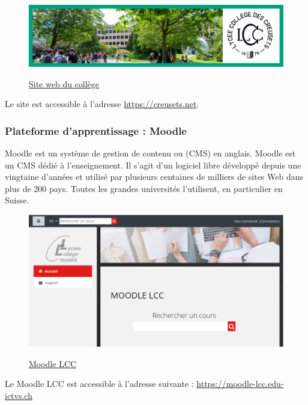 \documentclass[10pt,a4paper]{report}
\begin{document}
\begin{figure}[H]
	\centering
	\href{https://creusets.net}{
		\includegraphics[width=0.75\linewidth]{images/capture_creusets_20210811.png}
	}
	\caption{\protect \href{https://edu.vs.ch}{Site web du collège}}
	\label{fig:capturecreusets20210811}
\end{figure}

Le site est accessible à l'adresse \href{https://creusets.net}{https://creusets.net}.



\subsubsection{Plateforme d'apprentissage : Moodle}

Moodle est un système de gestion de contenu ou  (CMS) en anglais. Moodle est un CMS dédié à l'enseignement. Il s'agit d'un logiciel libre développé depuis une vingtaine d'années et utilisé par plusieurs centaines de milliers de sites Web dans plus de 200 pays. Toutes les grandes universités l'utilisent, en particulier en Suisse.

\begin{figure}[H]
	\centering
	\href{https://moodle-lcc.edu-ictvs.ch/}{
		\includegraphics[width=.75\linewidth]{images/capture_moodle_lcc_20210811}
	}
	\caption{\protect\href{https://moodle-lcc.edu-ictvs.ch/}{Moodle LCC}}
	\label{fig:capturemoodlelcc20210811}
\end{figure}

Le Moodle LCC est accessible à l'adresse suivante : \href{https://moodle-lcc.edu-ictvs.ch/}{https://moodle-lcc.edu-ictvs.ch}
\end{document}
